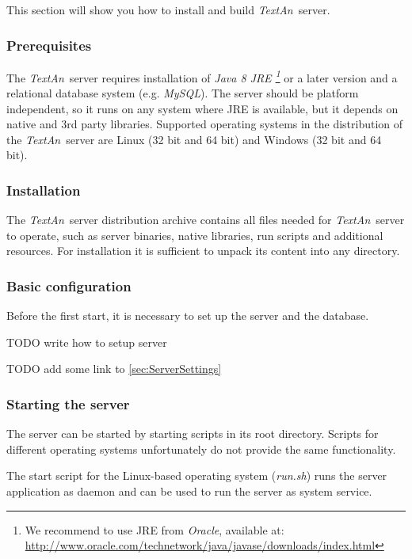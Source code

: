 \documentclass[12pt,a4paper]{report}
\newcommand{\textan}{\emph{TextAn}}
\begin{document}
This section will show you how to install and build \textan\ server. 

\subsubsection{Prerequisites}
\label{sssec:SerInstPre}

The \textan\ server requires installation of \emph{Java 8 JRE
\footnote{We recommend to use JRE from \emph{Oracle}, available at: \url{http://www.oracle.com/technetwork/java/javase/downloads/index.html}}}
or a later version and a relational database system (e.g. \emph{MySQL}).
The server should be platform independent, so it runs on any system where JRE is available,
but it depends on native and 3rd party libraries. 
Supported operating systems in the distribution of the \textan\ server are
Linux (32 bit and 64 bit) and Windows (32 bit and 64 bit). %

\subsubsection{Installation}

The \textan\ server distribution archive contains all files needed for \textan\ server to operate,
such as server binaries, native libraries, run scripts and additional resources.
For installation it is sufficient to unpack its content into any directory.

\subsubsection{Basic configuration}

Before the first start, it is necessary to set up the server and the database.

TODO write how to setup server

TODO add some link to \ref{sec:ServerSettings}

\subsubsection{Starting the server}

The server can be started by starting scripts in its root directory. 
Scripts for different operating systems unfortunately do not provide the same functionality.

The start script for the Linux-based operating system (\emph{run.sh}) runs the server application as daemon
and can be used to run the server as system service.
\end{document}
